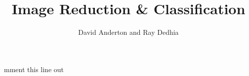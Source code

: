 mment this line out

\IEEEoverridecommandlockouts                              %
\overrideIEEEmargins



\usepackage{csquotes}
\usepackage{graphicx}

\title{\LARGE \bf Image Reduction \& Classification}
\author{David Anderton and Ray Dedhia}





\maketitle
\thispagestyle{empty}
\pagestyle{empty}


